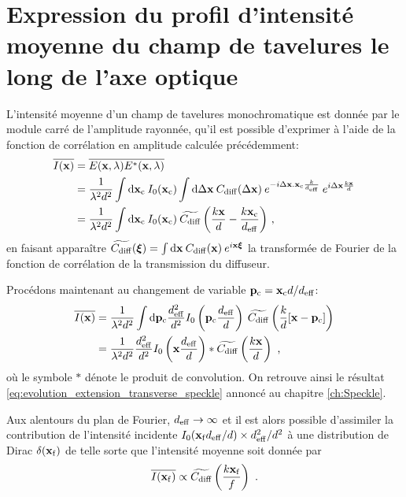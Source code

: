 \section{Expression du profil d'intensité moyenne du champ de tavelures le long de l'axe optique}
L'intensité moyenne d'un champ de tavelures monochromatique est donnée par le module carré de l'amplitude rayonnée, qu'il est possible d'exprimer à l'aide de la fonction de corrélation en amplitude calculée précédemment:
\begin{align}
\overline{I(\mathbf{x})} &= \overline{E(\mathbf{x},\lambda) E^*(\mathbf{x},\lambda)} \\
&= \frac{1}{\lambda^2 d^2} \int{\mathop{}\mathopen{}\mathrm{d}\mathbf{x}_{\mathrm{c}}\: I_0(\mathbf{x}_{\mathrm{c}}) \int{\mathop{}\mathopen{}\mathrm{d}\Delta\mathbf{x}\: C_{\mathrm{diff}}(\Delta\mathbf{x}) \: e^{-i \Delta\mathbf{x}. \mathbf{x}_{\mathrm{c}}\frac{k}{d_{\mathrm{eff}}}} \: e^{i\Delta\mathbf{x}\frac{k \mathbf{x}}{d}}}} \\
&= \frac{1}{\lambda^2 d^2} \int{\mathop{}\mathopen{}\mathrm{d}\mathbf{x}_{\mathrm{c}}\: I_0(\mathbf{x}_{\mathrm{c}}) \: \widetilde{C_{\mathrm{diff}}}\left(\frac{k\mathbf{x}}{d} - \frac{k\mathbf{x}_{\mathrm{c}}}{d_{\mathrm{eff}}}\right)} \text{ ,}
\end{align}
en faisant apparaître $\widetilde{C_{\mathrm{diff}}}(\boldsymbol{\xi})= \int{\mathop{}\mathopen{}\mathrm{d}\mathbf{x} \: C_{\mathrm{diff}}(\mathbf{x}) \: e^{i\mathbf{x}\boldsymbol{\xi}}}$ la transformée de Fourier de la fonction de corrélation de la transmission du diffuseur.

Procédons maintenant au changement de variable $\mathbf{p}_{\mathrm{c}} = \mathbf{x}_{\mathrm{c}} d/d_{\mathrm{eff}}$:
\begin{align}
\overline{I(\mathbf{x})} &= \frac{1}{\lambda^2d^2} \int{\mathop{}\mathopen{}\mathrm{d}\mathbf{p}_{\mathrm{c}} \frac{d_{\mathrm{eff}}^2}{d^2} I_0\left( \mathbf{p}_{\mathrm{c}} \frac{d_{\mathrm{eff}}}{d}\right) \: \widetilde{C_{\mathrm{diff}}} \left( \frac{k}{d} [\mathbf{x} - \mathbf{p}_{\mathrm{c}}] \right)} \\
&= \frac{1}{\lambda^2 d^2} \frac{d_{\mathrm{eff}}^2}{d^2} I_0\left( \mathbf{x} \frac{d_{\mathrm{eff}}}{d}\right) \ast \widetilde{C_{\mathrm{diff}}}\left( \frac{k\mathbf{x}}{d}\right) \text{ ,}
\end{align}
où le symbole $\ast$ dénote le produit de convolution. On retrouve ainsi le résultat \ref{eq:evolution_extension_transverse_speckle} annoncé au chapitre \ref{ch:Speckle}.

Aux alentours du plan de Fourier, $d_{\mathrm{eff}}\rightarrow\infty$ et il est alors possible d'assimiler la contribution de l'intensité incidente $I_0(\mathbf{x}_{\mathrm{f}} d_{\mathrm{eff}}/d) \times d_{\mathrm{eff}}^2/d^2$ à une distribution de Dirac $\delta(\mathbf{x}_{\mathrm{f}})$ de telle sorte que l'intensité moyenne soit donnée par
\begin{equation}
\overline{I(\mathbf{x}_{\mathrm{f}})} \propto \widetilde{C_{\mathrm{diff}}}\left( \frac{k\mathbf{x}_{\mathrm{f}}}{f}\right) \text{ .}
\end{equation}




